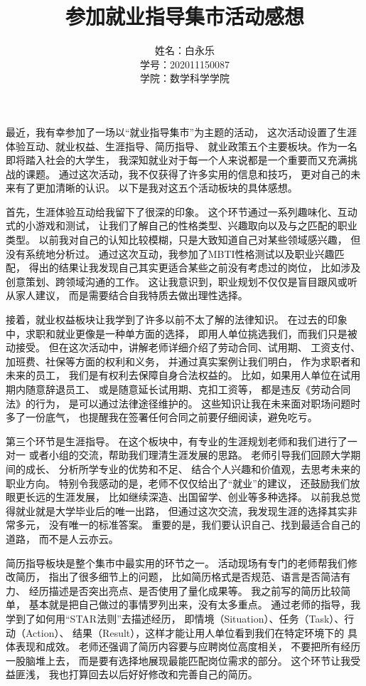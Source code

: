 \documentclass[UTF8]{ctexart}
\title{参加就业指导集市活动感想}
\author{姓名：白永乐 \\ 学号：202011150087 \\ 学院：数学科学学院}
\begin{document}
\maketitle
\thispagestyle{empty}
\newpage

最近，我有幸参加了一场以“就业指导集市”为主题的活动，
这次活动设置了生涯体验互动、就业权益、生涯指导、简历指导、
就业政策五个主要板块。作为一名即将踏入社会的大学生，
我深知就业对于每一个人来说都是一个重要而又充满挑战的课题。
通过这次活动，我不仅获得了许多实用的信息和技巧，
更对自己的未来有了更加清晰的认识。
以下是我对这五个活动板块的具体感想。

首先，生涯体验互动给我留下了很深的印象。
这个环节通过一系列趣味化、互动式的小游戏和测试，
让我们了解自己的性格类型、兴趣取向以及与之匹配的职业类型。
以前我对自己的认知比较模糊，只是大致知道自己对某些领域感兴趣，
但没有系统地分析过。
通过这次互动，我参加了MBTI性格测试以及职业兴趣匹配，
得出的结果让我发现自己其实更适合某些之前没有考虑过的岗位，
比如涉及创意策划、跨领域沟通的工作。
这让我意识到，职业规划不仅仅是盲目跟风或听从家人建议，
而是需要结合自我特质去做出理性选择。

接着，就业权益板块让我学到了许多以前不太了解的法律知识。
在过去的印象中，求职和就业更像是一种单方面的选择，
即用人单位挑选我们，而我们只是被动接受。
但在这次活动中，讲解老师详细介绍了劳动合同、试用期、
工资支付、加班费、社保等方面的权利和义务，
并通过真实案例让我们明白，
作为求职者和未来的员工，
我们是有权利去保障自身合法权益的。
比如，如果用人单位在试用期内随意辞退员工、
或是随意延长试用期、克扣工资等，
都是违反《劳动合同法》的行为，
是可以通过法律途径维护的。
这些知识让我在未来面对职场问题时多了一份底气，
也提醒我在签署任何合同之前要仔细阅读，避免吃亏。

第三个环节是生涯指导。
在这个板块中，有专业的生涯规划老师和我们进行了一对一
或者小组的交流，帮助我们理清生涯发展的思路。
老师引导我们回顾大学期间的成长、
分析所学专业的优势和不足、
结合个人兴趣和价值观，去思考未来的职业方向。
特别令我感动的是，老师不仅仅给出了“就业”的建议，
还鼓励我们放眼更长远的生涯发展，
比如继续深造、出国留学、创业等多种选择。
以前我总觉得就业就是大学毕业后的唯一出路，
但通过这次交流，我发现生涯的选择其实非常多元，
没有唯一的标准答案。
重要的是，我们要认识自己、找到最适合自己的道路，
而不是人云亦云。

简历指导板块是整个集市中最实用的环节之一。
活动现场有专门的老师帮我们修改简历，
指出了很多细节上的问题，
比如简历格式是否规范、语言是否简洁有力、
经历描述是否突出亮点、是否使用了量化成果等。
我之前写的简历比较简单，
基本就是把自己做过的事情罗列出来，没有太多重点。
通过老师的指导，我学到了如何用“STAR法则”去描述经历，
即情境（Situation）、任务（Task）、行动（Action）、
结果（Result），这样才能让用人单位看到我们在特定环境下的
具体表现和成效。
老师还强调了简历内容要与应聘岗位高度相关，
不要把所有经历一股脑堆上去，
而是要有选择地展现最能匹配岗位需求的部分。
这个环节让我受益匪浅，
我也打算回去以后好好修改和完善自己的简历。
\end{document}
